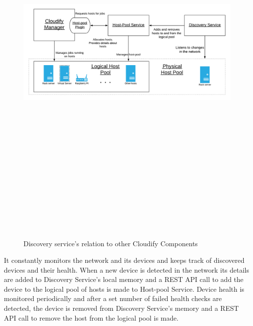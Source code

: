 \begin{figure}[ht!]
\centering
  \includegraphics[width=15cm,height=20cm, keepaspectratio]{Discovery_service.png}%
  \caption{Discovery service's relation to other Cloudify Components}
  \label{fig:discovery_service}
\end{figure}

It constantly monitors the network and its devices and keeps track of discovered devices and their health. When a new device is detected in the network its details are added to Discovery Service's local memory and a REST API call to add the device to the logical pool of hosts is made to Host-pool Service. Device health is monitored periodically and after a set number of failed health checks are detected, the device is removed from Discovery Service's memory and a REST API call to remove the host from the logical pool is made.